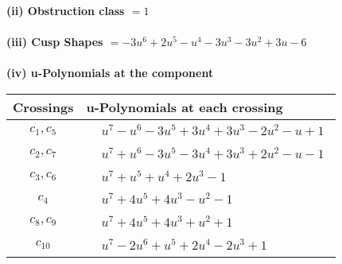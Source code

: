 \documentclass[1p]{elsarticle_modified}
\theoremstyle{definition}
\begin{document}
\flushleft \textbf{(ii) Obstruction class $= 1$}\\~\\
\flushleft \textbf{(iii) Cusp Shapes $= -3 u^6+2 u^5- u^4-3 u^3-3 u^2+3 u-6$}\\~\\
\newpage\renewcommand{\arraystretch}{1}
\flushleft \textbf{(iv) u-Polynomials at the component}\newline \\
\begin{tabular}{m{50pt}|m{274pt}}
Crossings & \hspace{64pt}u-Polynomials at each crossing \\
\hline $$\begin{aligned}c_{1},c_{5}\end{aligned}$$&$\begin{aligned}
&u^7- u^6-3 u^5+3 u^4+3 u^3-2 u^2- u+1
\end{aligned}$\\
\hline $$\begin{aligned}c_{2},c_{7}\end{aligned}$$&$\begin{aligned}
&u^7+u^6-3 u^5-3 u^4+3 u^3+2 u^2- u-1
\end{aligned}$\\
\hline $$\begin{aligned}c_{3},c_{6}\end{aligned}$$&$\begin{aligned}
&u^7+u^5+u^4+2 u^3-1
\end{aligned}$\\
\hline $$\begin{aligned}c_{4}\end{aligned}$$&$\begin{aligned}
&u^7+4 u^5+4 u^3- u^2-1
\end{aligned}$\\
\hline $$\begin{aligned}c_{8},c_{9}\end{aligned}$$&$\begin{aligned}
&u^7+4 u^5+4 u^3+u^2+1
\end{aligned}$\\
\hline $$\begin{aligned}c_{10}\end{aligned}$$&$\begin{aligned}
&u^7-2 u^6+u^5+2 u^4-2 u^3+1
\end{aligned}$\\
\hline
\end{tabular}\\~\\
\end{document}
